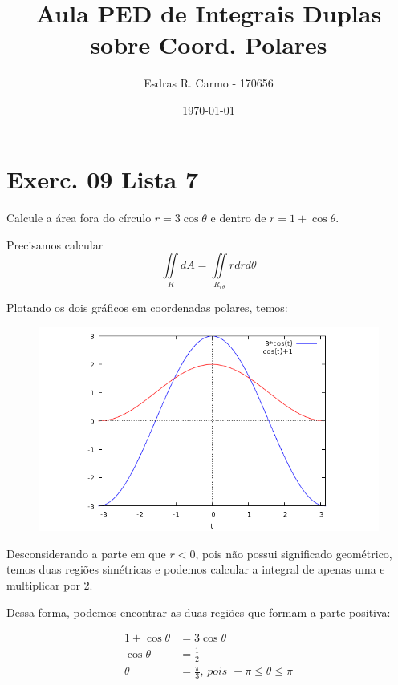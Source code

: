 \documentclass{article}
\author{Esdras R. Carmo - 170656}
\title{Aula PED de Integrais Duplas sobre Coord. Polares}
\date{\today}
\newcommand{\doubleint}[1] {\iint\limits_R #1 dA}
\newcommand{\doubleintp}[1] {\iint\limits_{R_{r\theta}} #1 r dr d\theta}
\begin{document}
    \maketitle

    \section{Exerc. 09 Lista 7}
        \paragraph{}
        Calcule a área fora do círculo $r = 3\cos{\theta}$ e dentro de $r = 1 + \cos{\theta}$.

        Precisamos calcular
        \[
            \doubleint{} = \doubleintp{}
        \]

        Plotando os dois gráficos em coordenadas polares, temos:

        \begin{figure}[h!]
            \includegraphics[width=\linewidth]{cos.png}
        \end{figure}

        Desconsiderando a parte em que $r < 0$, pois não possui significado geométrico,
        temos duas regiões simétricas e podemos calcular a integral de apenas uma e multiplicar
        por 2.

        Dessa forma, podemos encontrar as duas regiões que formam a parte positiva:

        \begin{align*}
            1 + \cos{\theta} &= 3\cos{\theta}\\
            \cos{\theta} &= \frac{1}{2}\\
            \theta &= \frac{\pi}{3} \textit{, pois } -\pi \leq \theta \leq \pi
        \end{align*}
\end{document}
